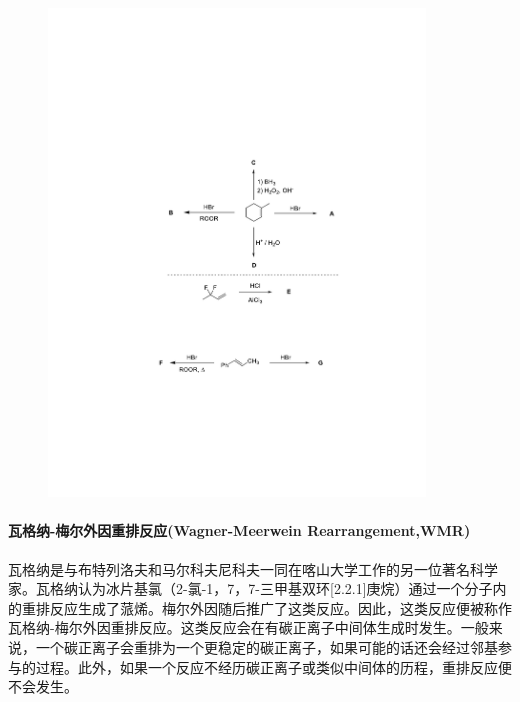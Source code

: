 \begin{figure}[h]
	\centering
	\includegraphics[width=10cm]{./pic/t4-3.pdf}
\end{figure}

\paragraph{瓦格纳-梅尔外因重排反应(Wagner-Meerwein Rearrangement,WMR)}

瓦格纳是与布特列洛夫和马尔科夫尼科夫一同在喀山大学工作的另一位著名科学家。瓦格纳认为冰片基氯（2-氯-1，7，7-三甲基双环{[}2.2.1{]}庚烷）通过一个分子内的重排反应生成了蒎烯。梅尔外因随后推广了这类反应。因此，这类反应便被称作瓦格纳-梅尔外因重排反应。这类反应会在有碳正离子中间体生成时发生。一般来说，一个碳正离子会重排为一个更稳定的碳正离子，如果可能的话还会经过邻基参与的过程。此外，如果一个反应不经历碳正离子或类似中间体的历程，重排反应便不会发生。

